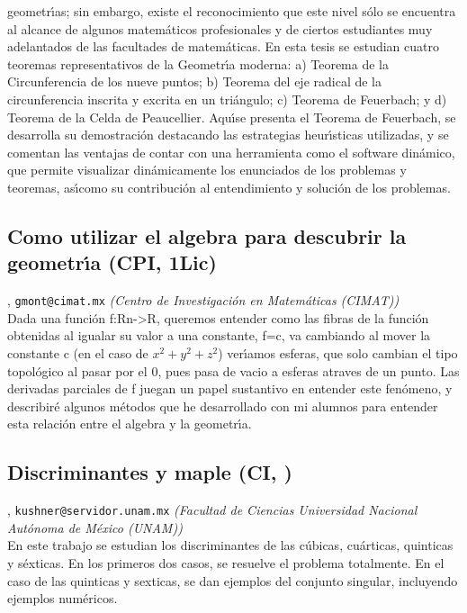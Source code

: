 geometr\'\i as; sin embargo, existe el reconocimiento que este nivel s\'olo se encuentra al alcance de algunos matem\'aticos profesionales y de ciertos estudiantes muy adelantados de las facultades de matem\'aticas. En esta tesis se estudian cuatro teoremas representativos de la Geometr\'\i a moderna: a) Teorema de la Circunferencia de los nueve puntos;  b) Teorema del eje radical de la circunferencia inscrita y excrita en un tri\'angulo; c) Teorema de Feuerbach; y d) Teorema de la Celda de Peaucellier. Aqu\'\i  se presenta el Teorema de Feuerbach, se desarrolla su demostraci\'on destacando las estrategias heur\'\i sticas utilizadas, y se comentan las ventajas de contar con una herramienta como el software din\'amico, que permite visualizar din\'amicamente los enunciados de los problemas y teoremas, as\'\i  como su contribuci\'on al entendimiento y soluci\'on de los problemas.
\subsection{\sffamily Como utilizar el algebra para descubrir la geometr\'\i a {\footnotesize (CPI, 1Lic)}} \label{reg-543} 
, {\tt gmont@cimat.mx}  {\slshape (Centro de Investigaci\'on en Matem\'aticas (CIMAT))}\\
          \noindent Dada una funci\'on f:Rn->R, queremos entender como las fibras de la funci\'on obtenidas al igualar su valor a una constante, f=c, va cambiando al mover la constante c (en el caso de $x^2+y^2+z^2$) ver\'\i amos esferas, que solo cambian el tipo topol\'ogico al pasar por el 0, pues pasa de vacio a esferas atraves de un punto. Las derivadas parciales de f juegan un papel sustantivo en entender este fen\'omeno, y describir\'e algunos m\'etodos que he desarrollado con mi alumnos para entender esta relaci\'on entre el algebra y la geometr\'\i a.
\subsection{\sffamily Discriminantes y maple {\footnotesize (CI, )}} \label{reg-649} 
, {\tt kushner@servidor.unam.mx}  {\slshape (Facultad de Ciencias Universidad Nacional Aut\'onoma de M\'exico (UNAM))}\\
          \noindent En este trabajo se estudian los discriminantes de las c\'ubicas, cu\'articas, quinticas y s\'exticas. En los primeros dos casos, se resuelve el problema totalmente. En el caso de las quinticas y sexticas, se dan ejemplos del conjunto singular, incluyendo ejemplos num\'ericos.
